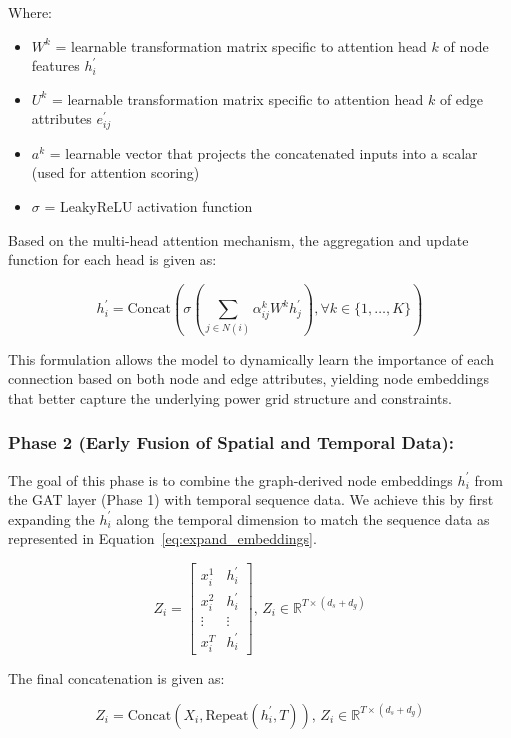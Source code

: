 \documentclass[sigconf,nonacm]{acmart}
\begin{document}
Where:
\begin{itemize}
    \item $W^k$ = learnable transformation matrix specific to attention head $k$ of node features $h_i^{'}$
    \item $U^k$ = learnable transformation matrix specific to attention head $k$ of edge attributes $e_{ij}^{'}$
    \item $a^k$ = learnable vector that projects the concatenated inputs into a scalar (used for attention scoring)
    \item $\sigma$ = LeakyReLU activation function
\end{itemize}

Based on the multi-head attention mechanism, the aggregation and update function for each head is given as:

\begin{equation}
h_i^{'} = \text{Concat}\left(\sigma\left(\sum_{j \in N(i)} \alpha_{ij}^k W^k h_j^{'}\right), \forall k \in \{1, \dots, K\}\right)
\label{eq:multi_head_attention}
\end{equation}

This formulation allows the model to dynamically learn the importance of each connection based on both node and edge attributes, yielding node embeddings that better capture the underlying power grid structure and constraints.
\subsubsection*{\textbf{Phase 2 (Early Fusion of Spatial and Temporal Data):}} The goal of this phase is to combine the graph-derived node embeddings $h_i^{'}$ from the GAT layer (Phase 1) with temporal sequence data. We achieve this by first expanding the $h_i^{'}$ along the temporal dimension to match the sequence data as represented in Equation~\ref{eq:expand_embeddings}.

\begin{equation}
Z_i = 
\begin{bmatrix}
x_i^1 & h_i^{'} \\
x_i^2 & h_i^{'} \\
\vdots & \vdots \\
x_i^T & h_i^{'}
\end{bmatrix}, \, Z_i \in \mathbb{R}^{T \times (d_s + d_g)}
\label{eq:expand_embeddings}
\end{equation}

The final concatenation is given as:

\begin{equation}
Z_i = \text{Concat}(X_i, \text{Repeat}(h_i^{'}, T)), \, Z_i \in \mathbb{R}^{T \times (d_s + d_g)}
\label{eq:concat_embeddings}
\end{equation}
\end{document}
